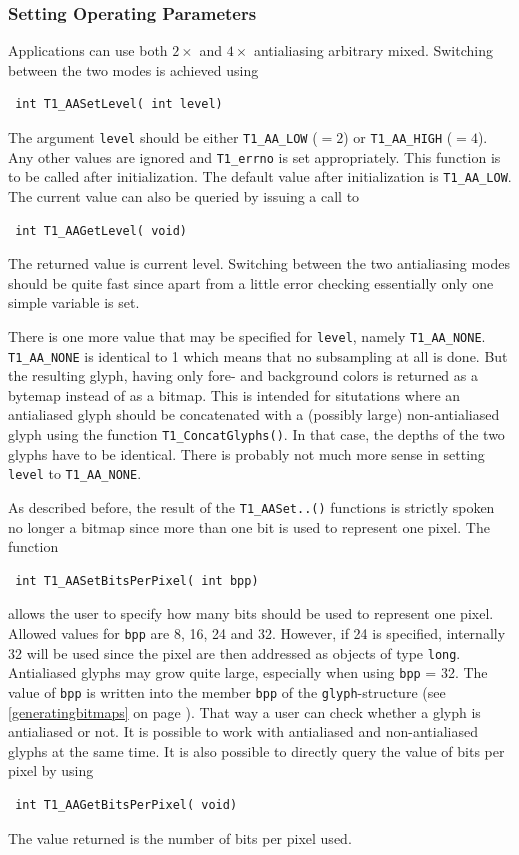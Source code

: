 \subsubsection{Setting Operating Parameters}
Applications can use both $2\times$ and $4\times$ antialiasing arbitrary
mixed. Switching between the two modes is achieved using
\precorr
\begin{verbatim}
 int T1_AASetLevel( int level)
\end{verbatim}\postcorr
The argument \verb+level+ should be either \verb+T1_AA_LOW+ ($=2$) or
\verb+T1_AA_HIGH+ ($=4$). Any other values are ignored and \verb+T1_errno+ is
set appropriately. This function is to be called after initialization. The
default value after initialization is \verb+T1_AA_LOW+. The current value can
also be queried by issuing a call to 
\precorr
\begin{verbatim}
 int T1_AAGetLevel( void)
\end{verbatim}\postcorr
The returned value is current level. Switching between the two antialiasing
modes should be quite fast since apart from a little error checking
essentially only one simple variable is set.

There is one more value that may be specified for \verb+level+, namely
\verb+T1_AA_NONE+. \verb+T1_AA_NONE+ is identical to 1 which means that no
subsampling at all is done. But the resulting glyph, having only fore- and
background colors is returned as a bytemap instead of as a bitmap. This is
intended for situtations where an antialiased glyph should be concatenated
with a (possibly large) non-antialiased glyph using the function
\verb+T1_ConcatGlyphs()+. In that case, the depths of the two glyphs have to
be identical. There is probably not much more sense in setting \verb+level+ to
\verb+T1_AA_NONE+.

As described before, the result of the \verb+T1_AASet..()+ functions is 
strictly spoken no longer a
bitmap since more than one bit is used to
represent one pixel. The function
\precorr
\begin{verbatim}
 int T1_AASetBitsPerPixel( int bpp)
\end{verbatim}\postcorr
allows the user to specify how many bits should be used to represent one
pixel. Allowed values for \verb+bpp+ are 8, 16, 24 and 32. However, if 24 is
specified, internally 32 will be used since the pixel are then addressed as
objects of type \verb+long+. Antialiased glyphs may grow quite large,
especially when 
using \verb+bpp+ = 32. The value of \verb+bpp+ is written into the member
\verb+bpp+ of the \verb+glyph+-structure (see \ref{generatingbitmaps} on page
\pageref{generatingbitmaps}).  That way a user can check whether a
glyph is antialiased or not. It is possible to work with antialiased
and non-antialiased glyphs at the same time.
It is also possible to directly query the value of bits per pixel by using
\precorr
\begin{verbatim}
 int T1_AAGetBitsPerPixel( void)
\end{verbatim}\postcorr
The value returned is the number of bits per pixel used.

